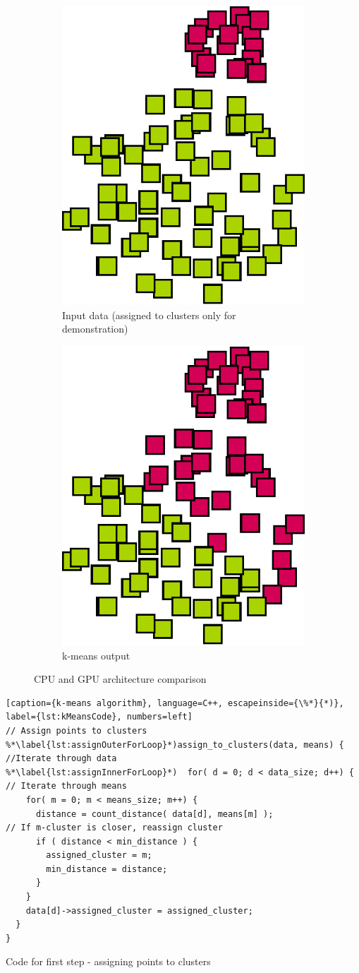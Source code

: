\begin{figure}[h]
\centering
\begin{subfigure}{.49\textwidth}
  \centering
  \includegraphics[width=.5\linewidth]{img/kmeans_badsample1.eps}
  \caption{Input data (assigned to clusters only for demonstration)}
  \label{fig:kmeansbadinput}
\end{subfigure}
\begin{subfigure}{.49\textwidth}
  \centering
  \includegraphics[width=.5\linewidth]{img/kmeans_badsample2.eps}
  \caption{k-means output}
  \label{fig:kmeansbadoutput}
\end{subfigure}
\caption{CPU and GPU architecture comparison}
\end{figure}

\begin{Code}
    \centering
\begin{lstlisting}[caption={k-means algorithm}, language=C++, escapeinside={\%*}{*)}, label={lst:kMeansCode}, numbers=left]
// Assign points to clusters
%*\label{lst:assignOuterForLoop}*)assign_to_clusters(data, means) {
//Iterate through data
%*\label{lst:assignInnerForLoop}*)  for( d = 0; d < data_size; d++) {
// Iterate through means
    for( m = 0; m < means_size; m++) {
      distance = count_distance( data[d], means[m] );
// If m-cluster is closer, reassign cluster
      if ( distance < min_distance ) {
        assigned_cluster = m;
        min_distance = distance;
      }
    }
    data[d]->assigned_cluster = assigned_cluster;
  }
}
\end{lstlisting}
    \caption{Code for first step - assigning points to clusters}
\end{Code}

